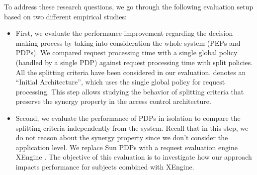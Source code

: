 To address these research questions, we go through the following evaluation setup based on two different empirical studies:
\begin{itemize}
\item First, we evaluate the performance improvement regarding the decision making process by taking into consideration the whole system 
(PEPs and PDPs). We compared request processing time with a single global policy (handled by a single PDP) against request processing time with
split policies. All the splitting criteria have been considered in our evaluation.
 denotes an ``Initial Architecture'', which uses the single global policy for request processing. 
This step allows studying the behavior of splitting criteria that preserve the synergy property in the access control architecture.

\item Second, we evaluate the performance of PDPs in isolation to compare the splitting criteria independently from the system.
Recall that in this step, we do not reason about the synergy property since we don't consider the application level.
We replace Sun PDPs with a request evaluation engine XEngine \cite{Xengine}. The objective of this evaluation is to investigate how our approach impacts performance for subjects combined with XEngine.
\end{itemize}


